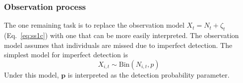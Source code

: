 \documentclass[12pt]{article}
\begin{document}

\subsubsection{Observation process}

The one
remaining task is to replace the observation model
$X_t = N_t + \zeta_t$ (Eq.~\ref{eq:ss1c}) with one that can be
more easily interpreted. The observation
model assumes that individuals are missed due to imperfect
detection. The simplest model for imperfect detection is
\begin{equation}
  X_{i,t} \sim \mathrm{Bin}(N_{i,t}, p)
  \label{eq:p1}
\end{equation}
Under this model, $\bm{p}$ is interpreted as the detection
probability parameter.


\end{document}

